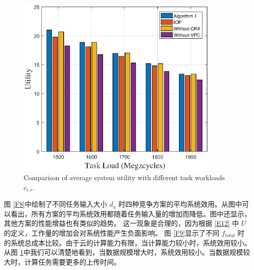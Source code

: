 \begin{figure}[H]
\centering
\includegraphics[width=10cm]{figures//chap3//diff_c.eps}
\caption{Comparison of average system utility with different task workloads $c_{i,e}$.}
\label{F10}
\end{figure}

图 \ref{F8}中绘制了不同任务输入大小 $d_u$ 时四种竞争方案的平均系统效用。从图中可以看出，所有方案的平均系统效用都随着任务输入量的增加而降低。图中还显示，其他方案的性能增益也有类似的趋势。
这一现象是合理的，因为根据 \eqref{E12} 中 $U$ 的定义，工作量的增加会对系统性能产生负面影响。
图 \ref{F9}显示了不同 $f_{total}$ 时的系统总成本比较。由于云的计算能力有限，当计算能力较小时，系统效用较小。
从图 \ref{F10}中我们可以清楚地看到，当数据规模增大时，系统效用较小。当数据规模较大时，计算任务需要更多的上传时间。
